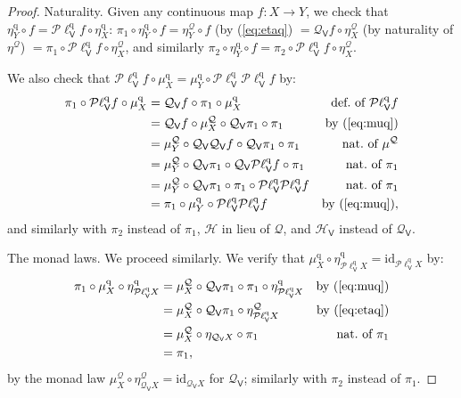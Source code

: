 \documentclass[preprint,12pt]{elsarticle}
\newcommand\identity[1]{\mathrm{id}_{#1}}
\newcommand\Smyth{{\mathcal Q}}
\newcommand\Hoare{{\mathcal H}}
\newcommand\Vt{\mathsf{V}}
\newcommand\HV{\Hoare_\Vt}
\newcommand\SV{\Smyth_{\Vt}}
\newcommand\quasi{\mathrm{q}} %
\newcommand\QL{\Plotkin^\quasi}
\newcommand\QLV{\QL_\Vt}
\newcommand\Plotkin{\mathcal P\ell} %
\begin{document}
\begin{proof}
  Naturality.  Given any continuous map $f \colon X \to Y$, we check
  that $\eta^\quasi_Y \circ f = \QLV f \circ \eta^\quasi_X$:
  $\pi_1 \circ \eta^\quasi_Y \circ f = \eta^\Smyth_Y \circ f$ (by
  (\ref{eq:etaq}) $= \SV f \circ \eta^\Smyth_X$ (by naturality of
  $\eta^\Smyth$) $= \pi_1 \circ \QLV f \circ \eta^\Smyth_X$, and
  similarly
  $\pi_2 \circ \eta^\quasi_Y \circ f = \pi_2 \circ \QLV f \circ
  \eta^\Smyth_X$.

  We also check that $\QLV f \circ \mu^\quasi_X = \mu^\quasi_Y \circ
  \QLV {\QLV f}$ by:
  \begin{align*}
    \pi_1 \circ \QLV f \circ \mu^\quasi_X
    & = \SV f \circ \pi_1 \circ \mu^\quasi_X
    & \text{def.\ of $\QLV f$} \\
    & = \SV f \circ \mu^\Smyth_X \circ \SV {\pi_1} \circ \pi_1
    & \text{by (\ref{eq:muq})} \\
    & = \mu^\Smyth_Y \circ \SV {\SV f} \circ \SV {\pi_1} \circ \pi_1
    & \text{nat.\ of $\mu^\Smyth$} \\
    & = \mu^\Smyth_Y \circ \SV {\pi_1} \circ \SV {\QLV f} \circ \pi_1
    & \text{nat.\ of $\pi_1$} \\
    & = \mu^\Smyth_Y \circ \SV {\pi_1} \circ \pi_1 \circ \QLV {\QLV f}
    & \text{nat.\ of $\pi_1$} \\
    & = \pi_1 \circ \mu^\quasi_Y \circ \QLV {\QLV f}
    & \text{by (\ref{eq:muq})},
  \end{align*}
  and similarly with $\pi_2$ instead of $\pi_1$, $\Hoare$ in lieu of
  $\Smyth$, and $\HV$ instead of $\SV$.
  
  The monad laws.  We proceed similarly.  We verify that $\mu^\quasi_X
  \circ \eta^\quasi_{\QLV X} = \identity {\QLV X}$ by:
  \begin{align*}
    \pi_1 \circ \mu^\quasi_X \circ \eta^\quasi_{\QLV X}
    & = \mu^\Smyth_X \circ \SV {\pi_1} \circ \pi_1 \circ
      \eta^\quasi_{\QLV X}
    & \text{by (\ref{eq:muq})} \\
    & = \mu^\Smyth_X \circ \SV {\pi_1} \circ \eta^\Smyth_{\QLV X}
    & \text{by (\ref{eq:etaq})} \\
    & = \mu^\Smyth_X \circ \eta_{\SV X} \circ \pi_1
    & \text{nat.\ of $\pi_1$} \\
    & = \pi_1,
  \end{align*}
  by the monad law
  $\mu^\Smyth_X \circ \eta^\Smyth_{\SV X} = \identity {\SV X}$ for
  $\SV$; similarly with $\pi_2$ instead of $\pi_1$.


\end{proof}
\end{document}
